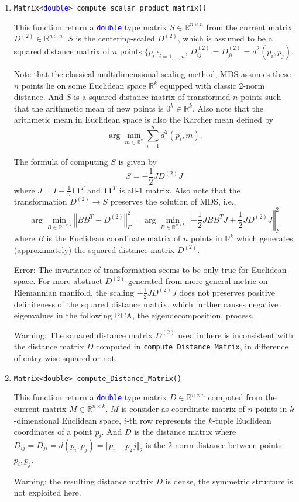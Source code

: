 \documentclass[11pt,a4paper]{article}
\newcommand{\mmemref}[2]{\texttt{#1}\label{#2#1}}
\newcommand{\ttype}[1]{\textcolor{blue}{\texttt{#1}}}
\theoremstyle{definition}
\theoremstyle{definition}
\numberwithin{equation}{section}
\begin{document}
	\begin{enumerate}
		\item \texttt{Matrix<\ttype{double}> compute\_scalar\_product\_matrix()}
		
		This function return a \ttype{double} type matrix $S\in \mathbb{R}^{n\times n}$ from the current matrix $D^{(2)}\in \mathbb{R}^{n\times n}$. $S$ is the centering-scaled $D^{(2)}$, which is assumed to be a squared distance matrix of $n$ points $\{p_i\}_{i=1,\cdots, n}$, $D^{(2)}_{ij}=D^{(2)}_{ji}=d^2(p_i,p_j)$. 
		
		Note that the classical multidimensional scaling method, \href{https://en.wikipedia.org/wiki/Multidimensional_scaling}{MDS} assumes these $n$ points lie on some Euclidean space $\mathbb{R}^k$ equipped with classic 2-norm distance. And $S$ is a squared distance matrix of transformed $n$ points such that the arithmetic mean of new points is $0^k\in \mathbb{R}^k$. Also note that the arithmetic mean in Euclidean space is also the Karcher mean defined by
		\[
			\arg\min\limits_{m\in \mathbb{R}^k}\sum_{i=1}^n d^2(p_i,m).
		\]
		
		The formula of computing $S$ is given by
		\[
			S=-\frac{1}{2}JD^{(2)}J
		\]
		where $J=I-\frac{1}{n}\mathbf{1}\mathbf{1}^T$ and $\mathbf{1}\mathbf{1}^T$ is all-1 matrix. Also note that the transformation $D^{(2)}\to S$ preserves the solution of MDS, i.e.,
		\[
			\arg\min\limits_{B\in \mathbb{R}^{n\times k}} \left\Vert BB^T - D^{(2)}\right\Vert^2_F = \arg\min\limits_{B\in \mathbb{R}^{n\times k}} \left\Vert -\frac{1}{2}JBB^TJ + \frac{1}{2}JD^{(2)}J\right\Vert^2_F
		\]
		where $B$ is the Euclidean coordinate matrix of $n$ points in $\mathbb{R}^k$ which generates (approximately) the squared distance matrix $D^{(2)}$.
		
		Error: The invariance of transformation seems to be only true for Euclidean space. For more abstract $D^{(2)}$ generated from more general metric on Riemannian manifold, the scaling $-\frac{1}{2}JD^{(2)}J$ does not preserves positive definiteness of the squared distance matrix, which further causes negative eigenvalues in the following PCA, the eigendecomposition, process.
		
		Warning: The squared distance matrix $D^{(2)}$ used in here is inconsistent with the distance matrix $D$ computed in \mmemref{compute\_Distance\_Matrix}{computeDistanceMatrix}, in difference of entry-wise squared or not. 
		
		\item \texttt{Matrix<double> compute\_Distance\_Matrix()}
		
		This function return a \ttype{double} type matrix $D\in \mathbb{R}^{n\times n}$ computed from the current matrix $M\in \mathbb{R}^{n\times k}$. $M$ is consider as coordinate matrix of $n$ points in $k$-dimensional Euclidean space, $i$-th row represents the $k$-tuple Euclidean coordinates of a point $p_i$. And $D$ is the distance matrix where $D_{ij}=D_{ji}=d(p_i,p_j)=\Vert p_i - p_2j\Vert_2$ is the 2-norm distance between points $p_i,p_j$.
		
		Warning: the resulting distance matrix $D$ is dense, the symmetric structure is not exploited here. 
	\end{enumerate}
\end{document}

